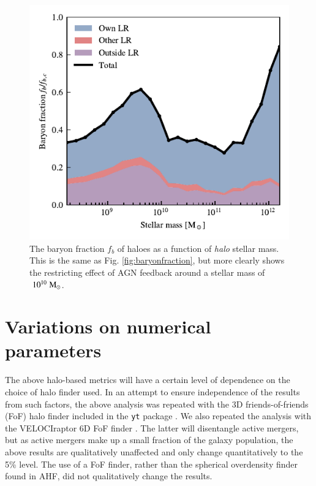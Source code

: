 \documentclass[fleqn,usenatbib]{mnras}
\newcommand{\msolar}{\;{\rm M}_{\odot}}
\newcommand{\velociraptor}{{\sc VELOCIraptor}}
\begin{document}
\begin{figure}
	\centering
	\includegraphics{figures/s50j7kAHF/baryon_fraction_breakdown_stellar.pdf}
	\vspace{-0.7cm}
	\caption{The baryon fraction $f_b$ of haloes as a function of \emph{halo}
	stellar mass. This is the same as Fig. \ref{fig:baryonfraction}, but more
	clearly shows the restricting effect of AGN feedback around a 
	stellar mass of $~10^{10}\msolar{}$.}
	\label{fig:baryonfractionstellar}
\end{figure} \section{Variations on numerical parameters}
\label{sec:convergence}

The above halo-based metrics will have a certain level of dependence on the
choice of halo finder used. In an attempt to ensure independence of the
results from such factors, the above analysis was repeated  with the 3D
friends-of-friends (FoF) halo finder included in the {\tt yt} package
\citep{Turk2011}. We also repeated the analysis with the \velociraptor{} 6D
FoF finder \citep{Elahi2019}. The latter will disentangle active mergers, but
as active mergers make up a small fraction of the galaxy population, the
above results are qualitatively unaffected and only change quantitatively
to the 5\% level. The use of a FoF finder, rather than the spherical
overdensity finder found in AHF, did not qualitatively change the results.
\end{document}
